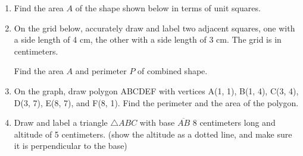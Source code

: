 \begin{enumerate}
\item Find the area $A$ of the shape shown below in terms of unit squares.
  \begin{flushleft}
  \end{flushleft}
 
\item On the grid below, accurately draw and label two adjacent squares, one with a side length of 4 cm, the other with a side length of 3 cm. The grid is in centimeters. \par \medskip
  Find the area $A$ and perimeter $P$ of combined shape.
  \begin{flushleft}
  \end{flushleft}
    
\item On the graph, draw polygon ABCDEF with vertices A(1, 1), B(1, 4), C(3, 4), D(3, 7), E(8, 7), and F(8, 1). Find the perimeter and the area of the polygon.
  \begin{flushleft}
    \end{flushleft}
    
\item Draw and label a triangle $\triangle ABC$ with base $\overline{AB}$ 8 centimeters long and altitude of 5 centimeters. (show the altitude as a dotted line, and make sure it is perpendicular to the base) 
  

\end{enumerate}
